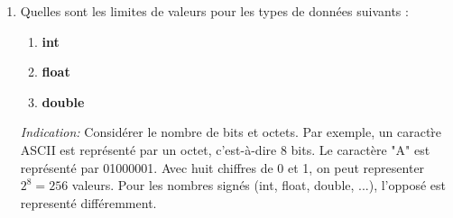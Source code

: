 \begin{enumerate}
	\item Quelles sont les limites de valeurs pour les types de données suivants :
	\begin{enumerate}
		\item \textbf{int}
		\item \textbf{float}
		\item \textbf{double}
	\end{enumerate}
\textit{Indication:} Consid\'erer le nombre de bits et octets. Par exemple, un caract\`re ASCII est repr\'esent\'e par un octet, c'est-\`a-dire 8 bits. Le caract\`ere "A" est repr\'esent\'e par 01000001. Avec huit chiffres de 0 et 1, on peut representer $2^8 = 256$ valeurs.  Pour les nombres  sign\'es (int, float, double, ...), l'oppos\'e est represent\'e diff\'eremment. 
\end{enumerate}

